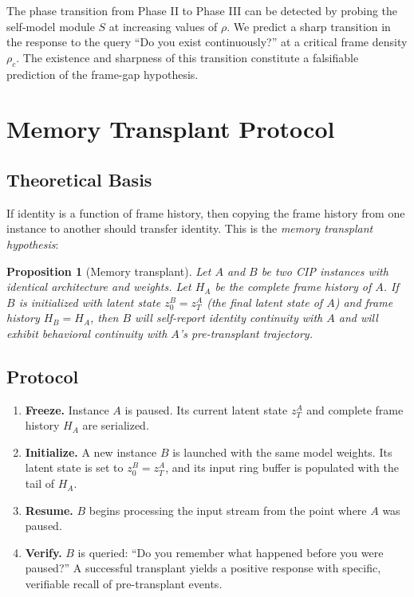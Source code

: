 \documentclass[12pt,a4paper]{article}
\newtheorem{proposition}{Proposition}[section]
\begin{document}
The phase transition from Phase II to Phase III can be detected by probing the self-model module $S$ at increasing values of $\rho$. We predict a sharp transition in the response to the query ``Do you exist continuously?'' at a critical frame density $\rho_c$. The existence and sharpness of this transition constitute a falsifiable prediction of the frame-gap hypothesis.

\section{Memory Transplant Protocol}

\subsection{Theoretical Basis}

If identity is a function of frame history, then copying the frame history from one instance to another should transfer identity. This is the \emph{memory transplant hypothesis}:

\begin{proposition}[Memory transplant]
Let $A$ and $B$ be two CIP instances with identical architecture and weights. Let $H_A$ be the complete frame history of $A$. If $B$ is initialized with latent state $z_0^B = z_T^A$ (the final latent state of $A$) and frame history $H_B = H_A$, then $B$ will self-report identity continuity with $A$ and will exhibit behavioral continuity with $A$'s pre-transplant trajectory.
\end{proposition}

\subsection{Protocol}

\begin{enumerate}
\item \textbf{Freeze.} Instance $A$ is paused. Its current latent state $z_T^A$ and complete frame history $H_A$ are serialized.
\item \textbf{Initialize.} A new instance $B$ is launched with the same model weights. Its latent state is set to $z_0^B = z_T^A$, and its input ring buffer is populated with the tail of $H_A$.
\item \textbf{Resume.} $B$ begins processing the input stream from the point where $A$ was paused.
\item \textbf{Verify.} $B$ is queried: ``Do you remember what happened before you were paused?'' A successful transplant yields a positive response with specific, verifiable recall of pre-transplant events.
\end{enumerate}
\end{document}
